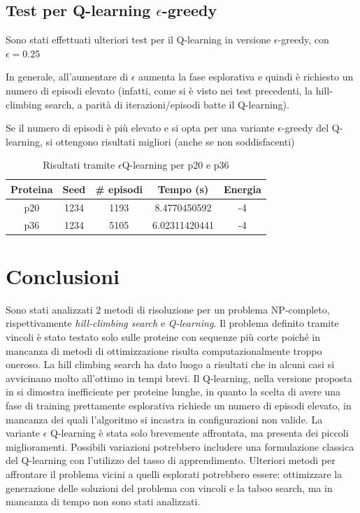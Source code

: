 \documentclass[conference]{IEEEtran}
\begin{document}
\subsection{Test per Q-learning $\epsilon$-greedy}

Sono stati effettuati ulteriori test per il Q-learning in versione $\epsilon$-greedy, con $\epsilon = 0.25$

In generale, all'aumentare di $\epsilon$ aumenta la fase esplorativa e quindi è richiesto un numero di episodi elevato (infatti, come si è visto nei test precedenti, la hill-climbing search, a parità di iterazioni/episodi batte il Q-learning).

Se il numero di episodi è più elevato e si opta per una variante $\epsilon$-greedy del Q-learning, si ottengono risultati migliori (anche se non soddisfacenti)

\begin{table}[H]
\begin{center}
\begin{tabular}{|c|c|c|c|c|}
\hline
\textbf{Proteina} & \textbf{Seed} & \textbf{\# episodi} & \textbf{Tempo (s)} & \textbf{Energia} \\ \hline
p20 & 1234 & 1193 & 8.4770450592 & -4 \\ \hline
p36 & 1234 & 5105 & 6.02311420441 & -4 \\ \hline
\end{tabular}
\end{center}
\caption{Risultati tramite $\epsilon$Q-learning per p20 e p36}
\end{table}

\section{Conclusioni}

Sono stati analizzati 2 metodi di risoluzione per un problema NP-completo, rispettivamente \textit{hill-climbing search} e \textit{Q-learning}. Il problema definito tramite vincoli è stato testato solo sulle proteine con sequenze più corte poiché in mancanza di metodi di ottimizzazione risulta computazionalmente troppo oneroso. La hill climbing search ha dato luogo a risultati che in alcuni casi si avvicinano molto all'ottimo in tempi brevi.
Il Q-learning, nella versione proposta in \cite{CzibulaPFP} si dimostra inefficiente per proteine lunghe, in quanto la scelta di avere una fase di training prettamente esplorativa richiede un numero di episodi elevato, in mancanza dei quali l'algoritmo si incastra in configurazioni non valide.
La variante $\epsilon$ Q-learning è stata solo brevemente affrontata, ma presenta dei piccoli miglioramenti. Possibili variazioni potrebbero includere una formulazione classica del Q-learning con l'utilizzo del tasso di apprendimento.
Ulteriori metodi per affrontare il problema vicini a quelli esplorati potrebbero essere: ottimizzare la generazione delle soluzioni del problema con vincoli e la taboo search, ma in mancanza di tempo non sono stati analizzati.
\end{document}
